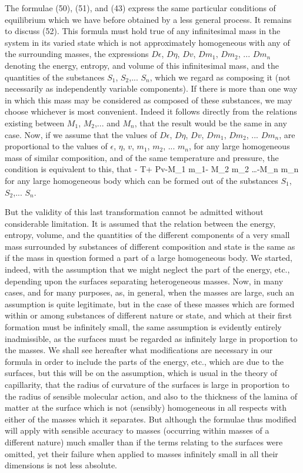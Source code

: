 \documentclass[12pt]{memoir}
\begin{document}
The formulae (50), (51), and (43) express the same particular conditions of equilibrium which we have before obtained by a less general process. It remains to discuss (52). This formula must hold true of any infinitesimal mass in the system in its varied state which is not approximately homogeneous with any of the surrounding masses, the expressions $D\epsilon$, $D\eta$, $Dv$, $Dm_1$, $Dm_2$, ... $D m_n$ denoting the energy, entropy, and volume of this infinitesimal mass, and the quantities of the substances $S_1$, $S_2$,... $S_n$, which we regard as composing it (not necessarily as independently variable components). If there is more than one way in which this mass may be considered as composed of these substances, we may choose whichever is most convenient. Indeed it follows directly from the relations existing between $M_1$, $M_2$,... and $M_n$, that the result would be the same in any case. Now, if we assume that the values of $D\epsilon$, $D\eta$, $Dv$, $Dm_1$, $Dm_2$, ... $D m_n$, are proportional to the values of $\epsilon$, $\eta$, $v$, $m_1$, $m_2$, ... $m_n$, for any large homogeneous mass of similar composition, and of the same temperature and pressure, the condition is equivalent to this, that
\eqs \epsilon- T\eta + Pv-M_1 m_1- M_2 m_2 \dots -M_n m_n       \label{53}\eqe
for any large homogeneous body which can be formed out of the substances $S_1$, $S_2$,... $S_n$.


But the validity of this last transformation cannot be admitted without considerable limitation. It is assumed that the relation between the energy, entropy, volume, and the quantities of the different components of a very small mass surrounded by substances of different composition and state is the same as if the mass in question formed a part of a large homogeneous body. We started, indeed, with the assumption that we might neglect the part of the energy, etc., depending upon the surfaces separating heterogeneous masses. Now, in many cases, and for many purposes, as, in general, when the masses are large, such an assumption is quite legitimate, but in the case of these masses which are formed within or among substances of different nature or state, and which at their first formation must be infinitely small, the same assumption is evidently entirely inadmissible, as the surfaces must be regarded as infinitely large in proportion to the masses. We shall see hereafter what modifications are necessary in our formula in order to include the parts of the energy, etc., which are due to the surfaces, but this will be on the assumption, which is usual in the theory of capillarity, that the radius of curvature of the surfaces is large in proportion to the radius of sensible molecular action, and also to the thickness of the lamina of matter at the surface which is not (sensibly) homogeneous in all respects with either of the masses which it separates. But although the formulae thus modified will apply with sensible accuracy to masses (occurring within masses of a different nature) much smaller than if the terms relating to the surfaces were omitted, yet their failure when applied to masses infinitely small in all their dimensions is not less absolute.
\end{document}
